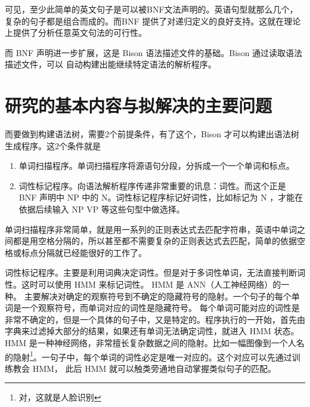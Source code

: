 \fbox{\begin{minipage}{12cm}
\vspace*{2ex}
ENDPUNC ::= '.' | '?' 

S ::= NP VP ENDPUNC | NP ENDPUNC | VP ENDPUNC | ...  < more >

NP ::= Det N | N  | Pron | < more >

Det ::= "the" | "an" | "a" | "this" | ... ...  < more >

V ::= "hit" | ...... < more >

N ::= "ball" | .... < more >

Pron ::= I | "you" | ..... <more>

.... <more>

\vspace*{2ex}
\end{minipage} }


可见，至少此简单的英文句子是可以被BNF文法声明的。英语句型就那么几个，复杂的句子都是组合而成的。而BNF
提供了对递归定义的良好支持。这就在理论上提供了分析任意英文句法的可行性。

而 BNF 声明进一步扩展，这是 Bison\cite{bison} 语法描述文件的基础。Bison 通过读取语法描述文件，可以
自动构建出能继续特定语法的解析程序。

\section{研究的基本内容与拟解决的主要问题}

而要做到构建语法树，需要2个前提条件，有了这个，Bison 才可以构建出语法树生成程序。这2个条件就是
\begin{enumerate}
\item 单词扫描程序。单词扫描程序将源语句分段，分拆成一个一个单词和标点。
\item 词性标记程序。向语法解析程序传递非常重要的讯息：词性。而这个正是 BNF 声明中 NP 中的 N。词性标记程序标记好词性，比如标记为 N ，才能在依据后续输入 NP VP 等这些句型中做选择。
\end{enumerate}

单词扫描程序非常简单，就是用一系列的正则表达式去匹配字符串，英语中单词之间都是用空格分隔的，所以甚至都不需要复杂的正则表达式去匹配，简单的依据空格或标点分隔就已经能很好的工作了。

词性标记程序。主要是利用词典决定词性。但是对于多词性单词，无法直接判断词性。这时可以使用 HMM\cite{HMM_Based_Part_Of_Speech_Tagging} 来标记词性。 HMM 是 ANN（人工神经网络）的一种。
主要解决对确定的观察符号到不确定的隐藏符号的隐射。一个句子的每个单词是一个观察符号，而单词对应的词性是隐藏符号。
每个单词可能对应的词性是非常不确定的，但是一个具体的句子中，又是特定的。程序执行的一开始，首先由字典来过滤掉大部分的结果，如果还有单词无法确定词性，就进入 HMM 状态。HMM 是一种神经网络，非常擅长复杂数据之间的隐射。比如一幅图像到一个人名的隐射\footnote{对，这就是人脸识别}。一句子中，每个单词的词性必定是唯一对应的。这个对应可以先通过训练教会 HMM， 此后 HMM 就可以触类旁通地自动掌握类似句子的匹配。

